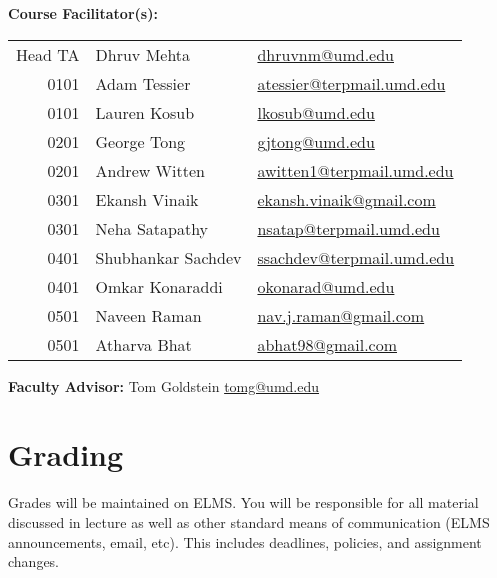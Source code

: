 \documentclass[12pt]{article}
\begin{document}


\medskip

\noindent\textbf{Course Facilitator(s): }

\begin{table}[H]
  \begin{tabular}{@{}rll}
    Head TA & Dhruv Mehta     & \href{mailto:dhruvnm@umd.edu}{dhruvnm@umd.edu}\\
    0101    & Adam Tessier    & \href{mailto:atessier@terpmail.umd.edu}{atessier@terpmail.umd.edu}\\
    0101    & Lauren Kosub    & \href{maito:lkosub@umd.edu}{lkosub@umd.edu}\\
    0201    & George Tong     & \href{mailto:gjtong@umd.edu}{gjtong@umd.edu}\\
    0201    & Andrew Witten   & \href{maito:awitten1@terpmail.umd.edu}{awitten1@terpmail.umd.edu}\\
    0301    & Ekansh Vinaik   & \href{mailto:ekansh.vinaik@gmail.com}{ekansh.vinaik@gmail.com}\\
    0301    & Neha Satapathy  & \href{mailto:nsatap@terpmail.umd.edu}{nsatap@terpmail.umd.edu}\\
    0401    & Shubhankar Sachdev & \href{maito:ssachdev@terpmail.umd.edu}{ssachdev@terpmail.umd.edu}\\
    0401    & Omkar Konaraddi & \href{maito:okonarad@umd.edu}{okonarad@umd.edu}\\
    0501    & Naveen Raman    & \href{mailto:nav.j.raman@gmail.com}{nav.j.raman@gmail.com}\\
    0501    & Atharva Bhat    & \href{mailto:abhat98@gmail.com}{abhat98@gmail.com}\\ 
  \end{tabular}
\end{table}
\medskip

\noindent\textbf{Faculty Advisor: }Tom Goldstein
\href{mailto:tomg@umd.edu}{tomg@umd.edu} \medskip

\bigskip
\section*{Grading}
\noindent Grades will be maintained on ELMS.
You will be responsible for all material discussed in lecture as well as other standard means of communication (ELMS announcements, email, etc).
This includes deadlines, policies, and assignment changes.
\end{document}
